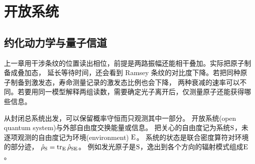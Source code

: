 \chapter{开放系统}
\label{ch:open}

\section{约化动力学与量子信道}

上一章用干涉条纹的位置读出相位，前提是两路振幅还能相干叠加。实际把原子制备成叠加态，
延长等待时间，还会看到 Ramsey 条纹的对比度下降。若把同种原子制备到激发态，寿命测量记录的激发态比例也会下降，
两种衰减的速率可以不同。若要用同一模型解释两组读数，需要确定光子离开后，仅测量原子还能获得哪些信息。

从封闭总系统出发，可以保留概率守恒而只观测其中一部分。
开放系统(open quantum system)与外部自由度交换能量或信息。
把关心的自由度记为系统$\mathrm{S}$，未逐项观测的自由度记为环境(environment) $\mathrm{E}$。
系统的状态是联合密度算符对环境的部分迹，
$\hat{\rho}_{\mathrm{S}} = \operatorname{tr}_{\mathrm{E}}\hat{\rho}_{\mathrm{SE}}$。
例如发光原子是$\mathrm{S}$，逸出到各个方向的辐射模式组成$\mathrm{E}$。

